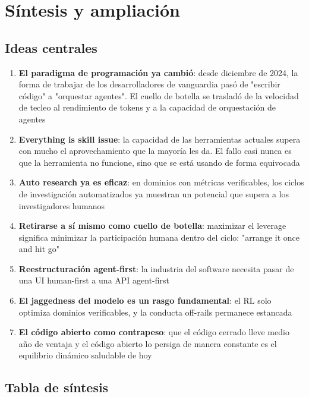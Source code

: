 \section{Síntesis y ampliación}

\subsection{Ideas centrales}

\begin{enumerate}
    \item \textbf{El paradigma de programación ya cambió}: desde diciembre de 2024, la forma de trabajar de los desarrolladores de vanguardia pasó de "escribir código" a "orquestar agentes". El cuello de botella se trasladó de la velocidad de tecleo al rendimiento de tokens y a la capacidad de orquestación de agentes
    \item \textbf{Everything is skill issue}: la capacidad de las herramientas actuales supera con mucho el aprovechamiento que la mayoría les da. El fallo casi nunca es que la herramienta no funcione, sino que se está usando de forma equivocada
    \item \textbf{Auto research ya es eficaz}: en dominios con métricas verificables, los ciclos de investigación automatizados ya muestran un potencial que supera a los investigadores humanos
    \item \textbf{Retirarse a sí mismo como cuello de botella}: maximizar el leverage significa minimizar la participación humana dentro del ciclo: "arrange it once and hit go"
    \item \textbf{Reestructuración agent-first}: la industria del software necesita pasar de una UI human-first a una API agent-first
    \item \textbf{El jaggedness del modelo es un rasgo fundamental}: el RL solo optimiza dominios verificables, y la conducta off-rails permanece estancada
    \item \textbf{El código abierto como contrapeso}: que el código cerrado lleve medio año de ventaja y el código abierto lo persiga de manera constante es el equilibrio dinámico saludable de hoy
\end{enumerate}

\subsection{Tabla de síntesis}


